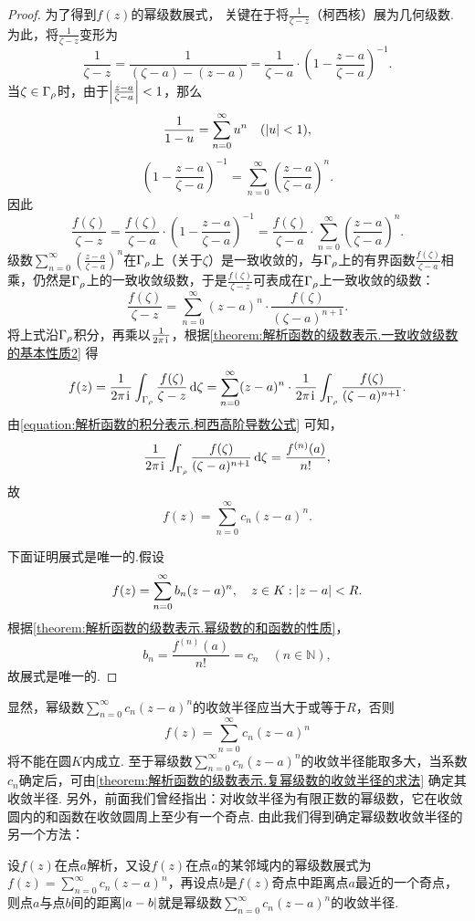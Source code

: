 \begin{theorem}
\begin{proof}
为了得到\(f(z)\)的幂级数展式，
关键在于将\(\frac{1}{\zeta-z}\)（柯西核）展为几何级数.
为此，将\(\frac{1}{\zeta-z}\)变形为\[
\frac{1}{\zeta-z}
= \frac{1}{(\zeta-a)-(z-a)}
= \frac{1}{\zeta-a} \cdot \left(1 - \frac{z-a}{\zeta-a}\right)^{-1}.
\]当\(\zeta \in \Gamma_{\rho}\)时，由于\(\abs{\frac{z-a}{\zeta-a}}<1\)，那么\[
\frac{1}{1-u} = \sum\limits_{n=0}^\infty u^n
\quad(\abs{u}<1),
\]\[
\left(1 - \frac{z-a}{\zeta-a}\right)^{-1}
= \sum\limits_{n=0}^\infty \left(\frac{z-a}{\zeta-a}\right)^n.
\]因此\[
\frac{f(\zeta)}{\zeta-z}
= \frac{f(\zeta)}{\zeta-a} \cdot \left(1 - \frac{z-a}{\zeta-a}\right)^{-1}
= \frac{f(\zeta)}{\zeta-a} \cdot \sum\limits_{n=0}^\infty \left(\frac{z-a}{\zeta-a}\right)^n.
\]级数\(\sum\limits_{n=0}^\infty \left(\frac{z-a}{\zeta-a}\right)^n\)在\(\Gamma_{\rho}\)上（关于\(\zeta\)）是一致收敛的，与\(\Gamma_{\rho}\)上的有界函数\(\frac{f(\zeta)}{\zeta-a}\)相乘，仍然是\(\Gamma_{\rho}\)上的一致收敛级数，于是\(\frac{f(\zeta)}{\zeta-z}\)可表成在\(\Gamma_{\rho}\)上一致收敛的级数：\[
\frac{f(\zeta)}{\zeta-z}
= \sum\limits_{n=0}^\infty (z-a)^n \cdot \frac{f(\zeta)}{(\zeta-a)^{n+1}}.
\]将上式沿\(\Gamma_{\rho}\)积分，再乘以\(\frac{1}{2\pi\kern1pt\mathrm{i}\kern1pt}\)，根据\cref{theorem:解析函数的级数表示.一致收敛级数的基本性质2} 得\[
f(z) = \frac{1}{2\pi\kern1pt\mathrm{i}\kern1pt} \int_{\Gamma_{\rho}} \frac{f(\zeta)}{\zeta-z} \dd{\zeta}
= \sum\limits_{n=0}^\infty (z-a)^n \cdot \frac{1}{2\pi\kern1pt\mathrm{i}\kern1pt} \int_{\Gamma_{\rho}} \frac{f(\zeta)}{(\zeta-a)^{n+1}}.
\]由\cref{equation:解析函数的积分表示.柯西高阶导数公式} 可知，\[
\frac{1}{2\pi\kern1pt\mathrm{i}\kern1pt} \int_{\Gamma_{\rho}} \frac{f(\zeta)}{(\zeta-a)^{n+1}} \dd{\zeta}
= \frac{f^{(n)}(a)}{n!},
\]故\[
f(z) = \sum\limits_{n=0}^\infty c_n (z-a)^n.
\]

下面证明展式是唯一的.假设\[
f(z) = \sum\limits_{n=0}^\infty b_n (z-a)^n,
\quad z \in K: \abs{z-a}<R.
\]根据\cref{theorem:解析函数的级数表示.幂级数的和函数的性质}，\[
b_n = \frac{f^{(n)}(a)}{n!} = c_n \quad (n\in\mathbb{N}),
\]故展式是唯一的.
\end{proof}
\end{theorem}
显然，幂级数\(\sum\limits_{n=0}^\infty c_n (z-a)^n\)的收敛半径应当大于或等于\(R\)，否则\[
f(z) = \sum\limits_{n=0}^\infty c_n (z-a)^n
\]将不能在圆\(K\)内成立.
至于幂级数\(\sum\limits_{n=0}^\infty c_n (z-a)^n\)的收敛半径能取多大，当系数\(c_n\)确定后，可由\cref{theorem:解析函数的级数表示.复幂级数的收敛半径的求法} 确定其收敛半径.
另外，前面我们曾经指出：对收敛半径为有限正数的幂级数，它在收敛圆内的和函数在收敛圆周上至少有一个奇点.
由此我们得到确定幂级数收敛半径的另一个方法：

设\(f(z)\)在点\(a\)解析，又设\(f(z)\)在点\(a\)的某邻域内的幂级数展式为\(f(z) = \sum\limits_{n=0}^\infty c_n (z-a)^n\)，再设点\(b\)是\(f(z)\)奇点中距离点\(a\)最近的一个奇点，则点\(a\)与点\(b\)间的距离\(\abs{a-b}\)就是幂级数\(\sum\limits_{n=0}^\infty c_n (z-a)^n\)的收敛半径.


